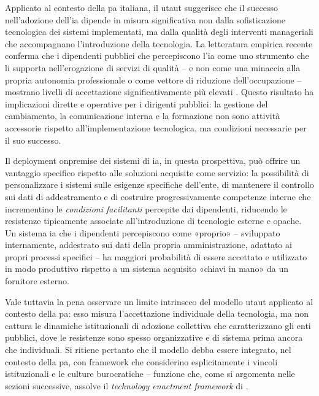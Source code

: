 Applicato al contesto della \gls{pa} italiana, il \gls{utaut} suggerisce che il successo nell'adozione dell'\gls{ia} dipende in misura significativa non dalla sofisticazione tecnologica dei sistemi implementati, ma dalla qualità degli interventi manageriali che accompagnano l'introduzione della tecnologia. La letteratura empirica recente conferma che i dipendenti pubblici che percepiscono l'\gls{ia} come uno strumento che li supporta nell'erogazione di servizi di qualità -- e non come una minaccia alla propria autonomia professionale o come vettore di riduzione dell'occupazione -- mostrano livelli di accettazione significativamente più elevati \parencite{Ahn2022}. Questo risultato ha implicazioni dirette e operative per i dirigenti pubblici: la gestione del cambiamento, la comunicazione interna e la formazione non sono attività accessorie rispetto all'implementazione tecnologica, ma condizioni necessarie per il suo successo.

Il deployment \gls{onpremise} dei sistemi di \gls{ia}, in questa prospettiva, può offrire un vantaggio specifico rispetto alle soluzioni acquisite come servizio: la possibilità di personalizzare i sistemi sulle esigenze specifiche dell'ente, di mantenere il controllo sui dati di addestramento e di costruire progressivamente competenze interne che incrementino le \textit{condizioni facilitanti} percepite dai dipendenti, riducendo le resistenze tipicamente associate all'introduzione di tecnologie esterne e opache. Un sistema \gls{ia} che i dipendenti percepiscono come «proprio» -- sviluppato internamente, addestrato sui dati della propria amministrazione, adattato ai propri processi specifici -- ha maggiori probabilità di essere accettato e utilizzato in modo produttivo rispetto a un sistema acquisito «chiavi in mano» da un fornitore esterno.

Vale tuttavia la pena osservare un limite intrinseco del modello \gls{utaut} applicato al contesto della \gls{pa}: esso misura l'accettazione individuale della tecnologia, ma non cattura le dinamiche istituzionali di adozione collettiva che caratterizzano gli enti pubblici, dove le resistenze sono spesso organizzative e di sistema prima ancora che individuali. Si ritiene pertanto che il modello debba essere integrato, nel contesto della \gls{pa}, con framework che considerino esplicitamente i vincoli istituzionali e le culture burocratiche -- funzione che, come si argomenta nelle sezioni successive, assolve il \textit{technology enactment framework} di \textcite{Fountain2001}.

